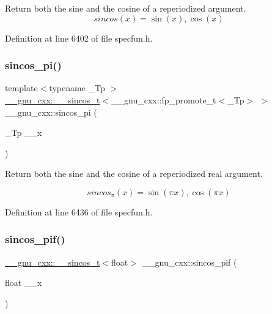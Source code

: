 Return both the sine and the cosine of a reperiodized argument. \[ sincos(x) = {\sin(x), \cos(x)} \] 

Definition at line 6402 of file specfun.\+h.

\mbox{\label{group__gnu__math__spec__func_ga6553883f127ea0de67041c3128e03813}} 
\subsubsection{\texorpdfstring{sincos\+\_\+pi()}{sincos\_pi()}}
{\footnotesize\ttfamily template$<$typename \+\_\+\+Tp $>$ \\
\hyperlink{struct____gnu__cxx_1_1____sincos__t}{\+\_\+\+\_\+gnu\+\_\+cxx\+::\+\_\+\+\_\+sincos\+\_\+t}$<$\+\_\+\+\_\+gnu\+\_\+cxx\+::fp\+\_\+promote\+\_\+t$<$\+\_\+\+Tp$>$ $>$ \+\_\+\+\_\+gnu\+\_\+cxx\+::sincos\+\_\+pi (\begin{DoxyParamCaption}\item[{\+\_\+\+Tp}]{\+\_\+\+\_\+x }\end{DoxyParamCaption})\hspace{0.3cm}{\ttfamily [inline]}}

Return both the sine and the cosine of a reperiodized real argument.

\[ sincos_\pi(x) = {\sin(\pi x), \cos(\pi x)} \] 

Definition at line 6436 of file specfun.\+h.

\mbox{\label{group__gnu__math__spec__func_gacf416c867a8a456f8f0e3d8b45ca8bd5}} 
\subsubsection{\texorpdfstring{sincos\+\_\+pif()}{sincos\_pif()}}
{\footnotesize\ttfamily \hyperlink{struct____gnu__cxx_1_1____sincos__t}{\+\_\+\+\_\+gnu\+\_\+cxx\+::\+\_\+\+\_\+sincos\+\_\+t}$<$float$>$ \+\_\+\+\_\+gnu\+\_\+cxx\+::sincos\+\_\+pif (\begin{DoxyParamCaption}\item[{float}]{\+\_\+\+\_\+x }\end{DoxyParamCaption})\hspace{0.3cm}{\ttfamily [inline]}}


